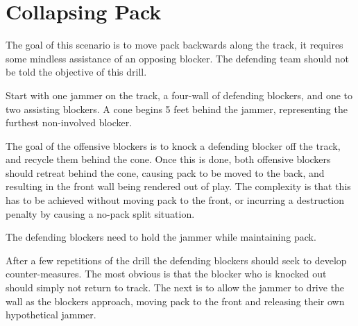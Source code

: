 \section{Collapsing Pack}
\label{sec:scenario/collapsing_pack}

The goal of this scenario is to move pack backwards along the track, it requires some mindless assistance of an opposing blocker.  
The defending team should not be told the objective of this drill.


Start with one jammer on the track, a four-wall of defending blockers, and one to two assisting blockers. 
A cone begins 5 feet behind the jammer, representing the furthest non-involved blocker. 

The goal of the offensive blockers is to knock a defending blocker off the track, and recycle them behind the cone. 
Once this is done, both offensive blockers should retreat behind the cone, causing pack to be moved to the back, and resulting in the front wall being rendered out of play. 
The complexity is that this has to be achieved without moving pack to the front, or incurring a destruction penalty by causing a no-pack split situation. 

The defending blockers need to hold the jammer while maintaining pack.  


After a few repetitions of the drill the defending blockers should seek to develop counter-measures.  
The most obvious is that the blocker who is knocked out should simply not return to track.
The next is to allow the jammer to drive the wall as the blockers approach, moving pack to the front and releasing their own hypothetical jammer.   
